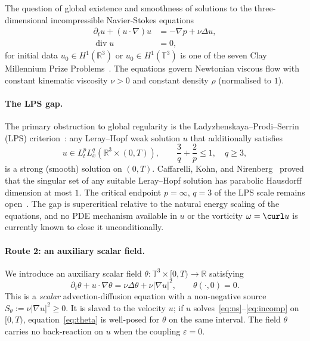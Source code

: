 \documentclass[11pt]{article}
\theoremstyle{definition}
\newcommand{\R}{\mathbb{R}}
\newcommand{\T}{\mathbb{T}}
\newcommand{\abs}[1]{\left|#1\right|}
\newcommand{\grad}{\nabla}
\newcommand{\divg}{\operatorname{div}}
\newcommand{\eps}{\varepsilon}
\newcommand{\thetafield}{\theta}
\begin{document}
The question of global existence and smoothness of solutions to the three-dimensional
incompressible Navier-Stokes equations
\begin{align}
  \partial_t u + (u \cdot \grad) u &= -\grad p + \nu \Delta u, \label{eq:ns}\\
  \divg u &= 0, \label{eq:incomp}
\end{align}
for initial data $u_0 \in H^1(\R^3)$ or $u_0 \in H^1(\T^3)$ is one of the seven
Clay Millennium Prize Problems~\cite{Fefferman2000}. The equations govern Newtonian
viscous flow with constant kinematic viscosity $\nu > 0$ and constant density $\rho$
(normalised to $1$).

\paragraph{The LPS gap.}
The primary obstruction to global regularity is the Ladyzhenskaya--Prodi--Serrin
(LPS) criterion~\cite{Prodi1959,Serrin1962,Ladyzhenskaya1967}:
any Leray--Hopf weak solution $u$ that additionally satisfies
\begin{equation}
  u \in L^p_t L^q_x(\R^3 \times (0,T)), \qquad
  \frac{3}{q} + \frac{2}{p} \leq 1, \quad q \geq 3,
  \label{eq:LPS}
\end{equation}
is a strong (smooth) solution on $(0,T)$.
Caffarelli, Kohn, and Nirenberg~\cite{CKN1982} proved that the singular set of any
suitable Leray--Hopf solution has parabolic Hausdorff dimension at most $1$.
The critical endpoint $p = \infty$, $q = 3$ of the LPS scale remains open~\cite{Tao2016}.
The gap is supercritical relative to the natural energy scaling of the equations, and
no PDE mechanism available in $u$ or the vorticity $\omega = \curl u$ is currently
known to close it unconditionally.

\paragraph{Route 2: an auxiliary scalar field.}
We introduce an auxiliary scalar field $\thetafield : \T^3 \times [0,T) \to \R$
satisfying
\begin{equation}
  \partial_t \thetafield + u \cdot \grad \thetafield
  = \nu \Delta \thetafield + \nu \abs{\grad u}^2, \qquad
  \thetafield(\cdot, 0) = 0.
  \label{eq:theta}
\end{equation}
This is a \emph{scalar} advection-diffusion equation with a non-negative source
$S_\theta := \nu \abs{\grad u}^2 \geq 0$.
It is slaved to the velocity $u$; if $u$ solves~\eqref{eq:ns}--\eqref{eq:incomp}
on $[0,T)$, equation~\eqref{eq:theta} is well-posed for $\thetafield$ on the same
interval. The field $\theta$ carries no back-reaction on $u$ when the coupling
$\eps = 0$.
\end{document}
